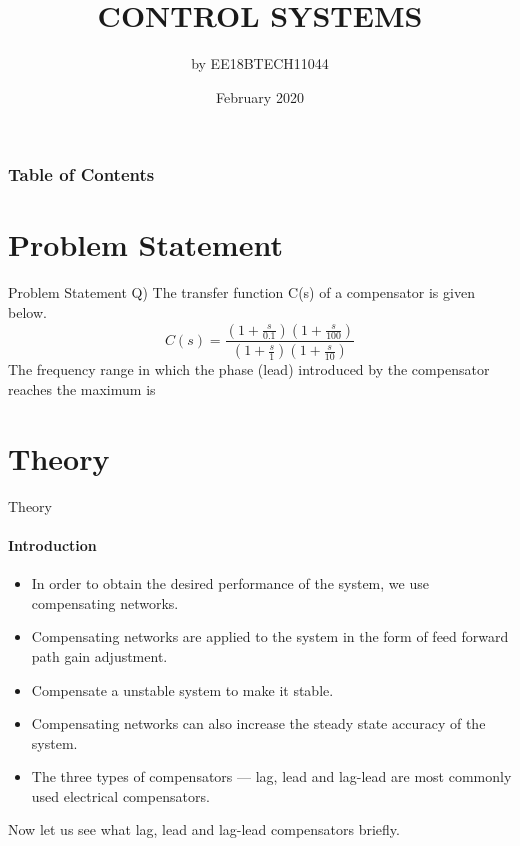 \documentclass{beamer}
\title{CONTROL SYSTEMS}
\author{by EE18BTECH11044}
\date{February 2020}
\begin{document}
\maketitle

\begin{frame}
\frametitle{Table of Contents}
\tableofcontents
\end{frame}

\section{Problem Statement}
\begin{frame}{Problem Statement}
Q) The transfer function C(s) of a compensator is given below.
\[C(s) = \frac{(1+\frac{s}{0.1})(1+\frac{s}{100})}{(1+\frac{s}{1})(1+\frac{s}{10})}\]
The frequency range in which the phase (lead) introduced by the compensator reaches the maximum is
\end{frame}
\section{Theory}

\begin{frame}{Theory}
\framesubtitle{Introduction}
\begin{itemize}
    \item In order to obtain the desired performance of the system, we use compensating networks. 
    \item Compensating networks are applied to the system in the form of feed forward path gain adjustment.
    \item Compensate a unstable system to make it stable.
    \item Compensating networks can also increase the steady state accuracy of the system.
    \item The three types of compensators — lag, lead and lag-lead are most commonly used electrical compensators.
\end{itemize}
Now let us see what lag, lead and lag-lead compensators briefly.
\end{frame}
\end{document}
